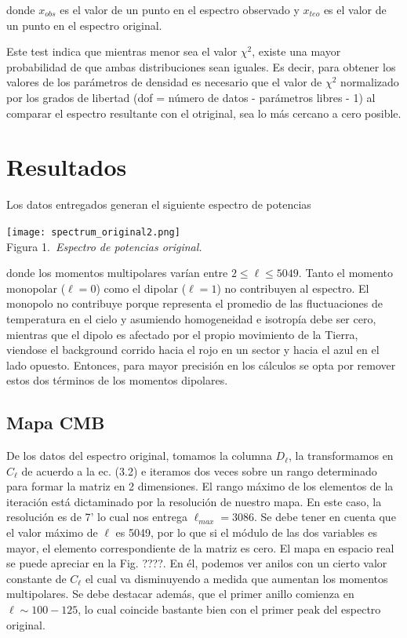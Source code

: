 \documentclass[twocolumn,letterpaper,spanish]{revtex4}
\numberwithin{equation}{section}
\begin{document}
donde $x_{obs}$ es el valor de un punto en el espectro observado y $x_{teo}$ es el valor de un punto en el espectro original.

Este test indica que mientras menor sea el valor $\chi^2$, existe una mayor probabilidad de que ambas distribuciones sean iguales. Es decir, para obtener los valores de los par\'ametros de densidad es necesario que el valor de $\chi^2$ normalizado por los grados de libertad (dof = n\'umero de datos - par\'ametros libres - 1) al comparar el espectro resultante con el otriginal, sea lo m\'as cercano a cero posible.


\section{Resultados}\label{resultados}

Los datos entregados generan el siguiente espectro de potencias

\begin{center}
   \texttt{[image: spectrum\_original2.png]}\\
   Figura 1.\emph{\ Espectro de potencias original.}
\end{center}
donde los momentos multipolares var\'ian entre $2\leq\ell\leq 5049$. Tanto el momento monopolar ($\ell=0$) como el dipolar ($\ell=1$) no contribuyen al espectro. El monopolo no contribuye porque representa el promedio de las fluctuaciones de temperatura en el cielo y asumiendo homogeneidad e isotrop\'ia debe ser cero, mientras que el dipolo es afectado por el propio movimiento de la Tierra, viendose el background corrido hacia el rojo en un sector y hacia el azul en el lado opuesto. Entonces, para mayor precisi\'on en los c\'alculos se opta por remover estos dos t\'erminos de los momentos dipolares.


\subsection{Mapa CMB}

De los datos del espectro original, tomamos la columna $D_{\ell}$, la transformamos en $C_{\ell}$ de acuerdo a la ec. (3.2) e iteramos dos veces sobre un rango determinado para formar la matriz en 2 dimensiones. El rango m\'aximo de los elementos de la iteraci\'on est\'a dictaminado por la resoluci\'on de nuestro mapa. En este caso, la resoluci\'on es de 7' lo cual nos entrega $\ell_{max}=3086$. Se debe tener en cuenta que el valor m\'aximo de $\ell$ es 5049, por lo que si el m\'odulo de las dos variables es mayor, el elemento correspondiente de la matriz es cero. El mapa en espacio real se puede apreciar en la Fig. ????. En \'el, podemos ver anilos con un cierto valor constante de $C_{\ell}$ el cual va disminuyendo a medida que aumentan los momentos multipolares.
Se debe destacar adem\'as, que el primer anillo comienza en $\ell\sim 100-125$, lo cual coincide bastante bien con el primer peak del espectro original.
\end{document}
